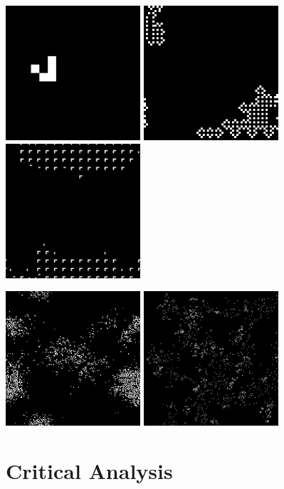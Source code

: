 \documentclass[11pt, oneside]{article}
\begin{document}
\begin{center}


    \includegraphics[width=5cm]{images/16x16_2_1.png}
    \includegraphics[width=5cm]{images/64x64_2_1.png}
    \includegraphics[width=5cm]{images/128x128_2.png}
    
    
    	
    \includegraphics[width=5cm]{images/256x256_2.png}
    \includegraphics[width=5cm]{images/512x512_2.png}
\end{center}

\pagebreak
\section{Critical Analysis}




\end{document}
